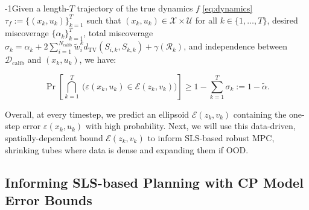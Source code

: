 \documentclass{l4dc2026}
\newcommand{\calib}{\mathcal{D}_{\mathrm{calib}}}
\newcommand{\tvd}{d_\textrm{TV}}
\newcommand{\red}[1]{{\color{red}{#1}}}
\renewcommand{\red}[1]{{\color{red}{#1}}}
\begin{document}
\vspace{-4pt}
\begin{theorem}\label{thm:total_coverage}
    \looseness-1Given a length-$T$ trajectory of the true dynamics $f$ \eqref{eq:dynamics} $\tau_f:= \{(x_k, u_k)\}_{k=1}^{T}$ such that $(x_k, u_k) \in \mathcal{X} \times \mathcal{U}$ for all $k \in \{1, \ldots, T\}$, desired miscoverage $\{\alpha_k\}_{k=1}^T$, total miscoverage $\sigma_k = \alpha_k + 2\sum_{i=1}^{N_\textrm{calib}} \tilde{w}_i^k \tvd(S_{i,k}, S_{k,k})+ \gamma({\mathcal{R}_k})$, and independence between  $\calib$ and $(x_k,u_k)$, we have:

    \vspace{-10pt}
    \begin{equation}\textstyle
        \Pr[\bigcap_{k=1}^{T}~\big(\varepsilon(x_k,u_k) \in \mathcal{E}(z_k,v_k)\big)] \ge 1- \sum_{k=1}^{T}\sigma_k := 1-\tilde\alpha.
    \end{equation}
\vspace{-20pt}
    
\end{theorem}
Overall, at every timestep, we predict an ellipsoid $\mathcal{E}(z_k,v_k)$ containing the one-step error $\varepsilon(x_k,u_k)$ with high probability. Next, we will use this data-driven, spatially-dependent bound $\mathcal{E}(z_k, v_k)$ to inform SLS-based robust MPC, shrinking tubes where data is dense and expanding them if OOD.

\vspace{-10pt}
\subsection{Informing SLS-based Planning with CP Model Error Bounds}\label{sec:sls_plus_cp_bound}
\end{document}
